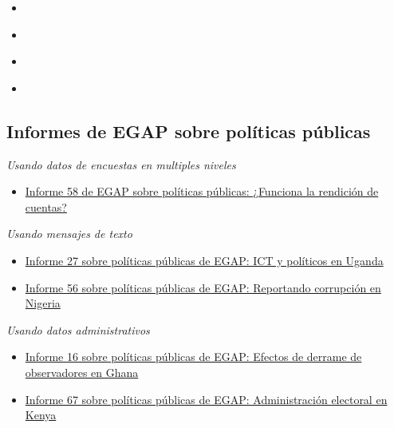 \documentclass[12pt,spanish,]{book}
\providecommand{\tightlist}{%
  \setlength{\itemsep}{0pt}\setlength{\parskip}{0pt}}
\begin{document}
\begin{itemize}
\item
  \autocite{adcocoll:2001}
\item
  \autocite{scacco_can_2018}
\item
  \autocite{shadish2002experimental}
\item
  \autocite{vicente_is_2014}
\end{itemize}

\hypertarget{informes-de-egap-sobre-poluxedticas-puxfablicas-2}{%
\subsection{Informes de EGAP sobre políticas públicas}\label{informes-de-egap-sobre-poluxedticas-puxfablicas-2}}

\emph{Usando datos de encuestas en multiples niveles}

\begin{itemize}
\tightlist
\item
  \href{https://egap.org/resource/does-bottom-up-accountability-work-evidence-from-uganda/}{Informe 58 de EGAP sobre políticas públicas: ¿Funciona la rendición de cuentas?}
\end{itemize}

\emph{Usando mensajes de texto}

\begin{itemize}
\item
  \href{https://egap.org/resource/brief-27-ict-and-politicians-in-uganda/}{Informe 27 sobre políticas públicas de EGAP: ICT y políticos en Uganda}
\item
  \href{https://egap.org/resource/reporting-corruption-in-nigeria-testing-the-effects-of-norms-nudges/}{Informe 56 sobre políticas públicas de EGAP: Reportando corrupción en Nigeria}
\end{itemize}

\emph{Usando datos administrativos}

\begin{itemize}
\item
  \href{https://egap.org/resource/brief-16-spillover-effects-of-observers-in-ghana/}{Informe 16 sobre políticas públicas de EGAP: Efectos de derrame de observadores en Ghana}
\item
  \href{https://egap.org/resource/electoral-administration-in-kenya/}{Informe 67 sobre políticas públicas de EGAP: Administración electoral en Kenya}
\end{itemize}
\end{document}
